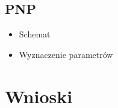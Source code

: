 \documentclass{article}
\begin{document}
\subsection{PNP}

\begin{itemize}
    \item Schemat
    \item Wyznaczenie parametrów
\end{itemize}

\section{Wnioski}
\end{document}
